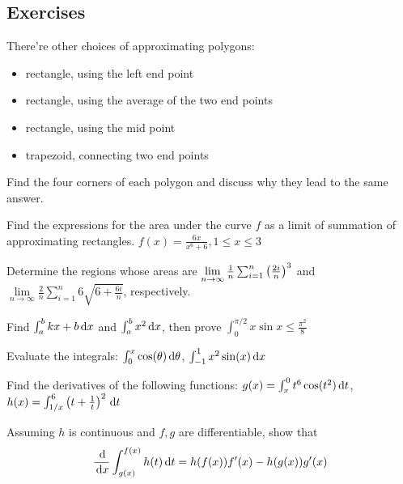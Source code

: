 \documentclass[Calculus 1 Recitation.tex]{subfiles}
\begin{document}
\subsection{Exercises}
\begin{myleftlinebox}
	There're other choices of approximating polygons:
	\begin{itemize}
		\item rectangle, using the left end point
		\item rectangle, using the average of the two end points
		\item rectangle, using the mid point
		\item trapezoid, connecting two end points
	\end{itemize}
	Find the four corners of each polygon and discuss why they lead to the same answer.
	\tcblower
	\vspace{2em}
\end{myleftlinebox}

\begin{myleftlinebox}
	Find the expressions for the area under the curve $f$ as a limit of summation of approximating rectangles. $f(x)=\frac{6x}{x^6+6}, 1\leq x\leq 3$
	\tcblower
	\vspace{2em}
\end{myleftlinebox}

\begin{myleftlinebox}
	Determine the regions whose areas are $\lim\limits_{n\to\infty} \frac{1}{n}\sum_{i=1}^n \left( \frac{2i}{n} \right)^3$ and $\lim\limits_{n\to\infty} \frac{2}{n}\sum_{i=1}^n 6\sqrt{6+\frac{6i}{n}}$, respectively.
	\tcblower
	\vspace{2em}
\end{myleftlinebox}

\begin{myleftlinebox}
	Find $\int_a^b kx+b\,\mathrm{d} x$ and $\int_a^b x^2\,\mathrm{d} x$, then prove $\int_0^{\pi/2} x\sin x\leq \frac{\pi^2}{8}$
	\tcblower
	\vspace{2em}
\end{myleftlinebox}

\begin{myleftlinebox}
	Evaluate the integrals: $\int_{0}^{x}\cos(\theta)\,\mathrm{d} \theta$, $\int_{-1}^1 x^2\sin(x) \,\mathrm{d} x$
	\tcblower
	\vspace{2em}
\end{myleftlinebox}

\begin{myleftlinebox}
	Find the derivatives of the following functions: $g(x)=\int_x^0 t^6\cos(t^2)\,\mathrm{d} t$, $h(x)=\int_{1/x}^6 \left( t+\frac{1}{t} \right)^2\,\mathrm{d} t$
	\tcblower
	\vspace{2em}
\end{myleftlinebox}

\begin{myleftlinebox}
	Assuming $h$ is continuous and $f,g$ are differentiable, show that
	\[\frac{\,\mathrm{d}}{\,\mathrm{d} x} \int_{g(x)}^{f(x)} h(t)\,\mathrm{d} t = h(f(x))f'(x)-h(g(x))g'(x)\]
	\tcblower
	\vspace{2em}
\end{myleftlinebox}
\end{document}
